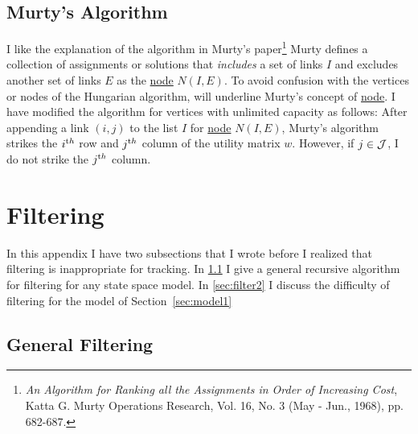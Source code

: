 \documentclass[12pt]{article}
\begin{document}
\subsection{Murty's Algorithm}
\label{sec:murty}

I like the explanation of the algorithm in Murty's
paper\footnote{\emph{An Algorithm for Ranking all the Assignments in
    Order of Increasing Cost}, Katta G.  Murty Operations Research,
  Vol. 16, No. 3 (May - Jun., 1968), pp.  682-687.}  Murty defines a
collection of assignments or solutions that \emph{includes} a set of
links $I$ and excludes another set of links $E$ as the
\underline{node} $N(I,E)$.  To avoid confusion with the vertices or
nodes of the Hungarian algorithm, will underline Murty's concept of
\underline{node}.  I have modified the algorithm for vertices with
unlimited capacity as follows: After appending a link $(i,j)$ to the
list $I$ for \underline{node} $N(I,E)$, Murty's algorithm strikes the
$i^{\text th}$ row and $j^{\text th}$ column of the utility matrix
$w$.  However, if $j\in {\cal J}$, I do not strike the $j^{\text th}$
column.

\section{Filtering}
\label{sec:filtering}

In this appendix I have two subsections that I wrote before I
realized that filtering is inappropriate for tracking.  In
\ref{sec:filtering1} I give a general recursive algorithm for filtering
for any state space model.  In \ref{sec:filter2} I discuss the
difficulty of filtering for the model of Section~\ref{sec:model1}

\subsection{General Filtering}
\label{sec:filtering1}
\end{document}
